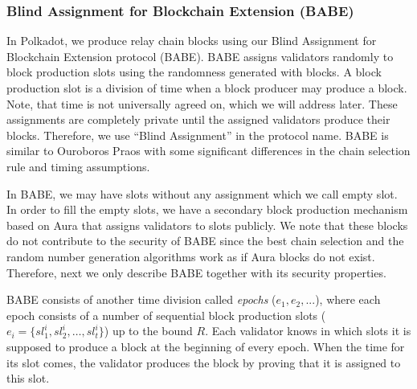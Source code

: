 \subsubsection{Blind Assignment for Blockchain Extension (BABE)}
\label{sec:babe}

In Polkadot, we produce relay chain blocks using our Blind Assignment for Blockchain Extension protocol (BABE).
BABE assigns validators randomly to block production slots using  the randomness generated with blocks. A block production slot is a division of time when a block producer may produce a block. Note, that time is not universally agreed on, which we will address later.  These assignments are completely private until the assigned validators produce their blocks. Therefore, we use ``Blind Assignment'' in the protocol name. BABE is similar to Ouroboros Praos \cite{Praos} with some significant differences in the chain selection rule and timing assumptions.

In BABE, we may have slots without any assignment
 which we call empty slot. 
In order to fill the empty slots, we have a
secondary block production mechanism based on Aura \cite{aura} that assigns validators to slots publicly. We note that these blocks do not contribute to
the security of BABE since the best chain selection and the random number generation algorithms work as if Aura blocks do not exist.
Therefore, next we only describe BABE together with its security properties.


BABE \cite{babe} consists of another time division called \emph{epochs} ($e_1,e_2,...$), where each epoch consists of a number of sequential block production slots (\(e_i = \{sl^i_{1}, sl^i_{2},\ldots,sl^i_{t}\}\)) up to the bound  $R$.
Each validator knows in which slots it is supposed to produce a block at the beginning of every epoch. When the time for its slot comes, the validator produces the block by proving that it is assigned to
this slot.

